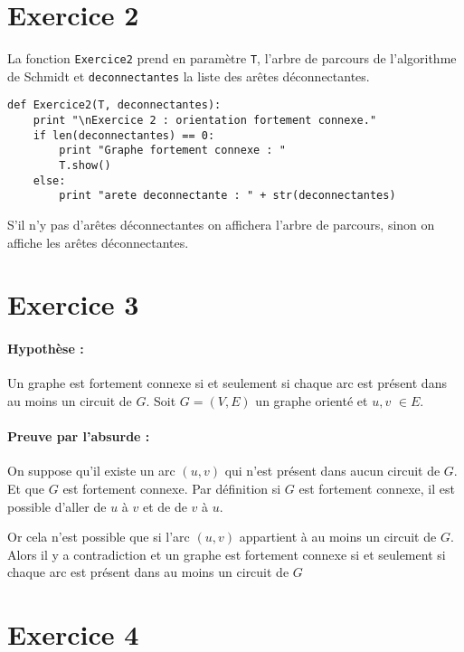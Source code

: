 \documentclass[11pt, a4paper]{article}
\begin{document}
\section*{Exercice 2}
La fonction \verb|Exercice2| prend en paramètre \verb|T|, l'arbre de parcours de l'algorithme de Schmidt et \verb|deconnectantes| la liste des arêtes déconnectantes.

\begin{verbatim}
def Exercice2(T, deconnectantes):
    print "\nExercice 2 : orientation fortement connexe."
    if len(deconnectantes) == 0:
        print "Graphe fortement connexe : "
        T.show()
    else:
        print "arete deconnectante : " + str(deconnectantes)
\end{verbatim}

S'il n'y pas d'arêtes déconnectantes on affichera l'arbre de parcours, sinon on affiche les arêtes déconnectantes.

\section*{Exercice 3}

\paragraph{Hypothèse :}Un graphe est fortement connexe si et seulement si chaque arc est présent dans au moins un circuit de $G$. Soit $G=(V,E)$ un graphe orienté et $u,v$ $\in E$.
\paragraph{Preuve par l'absurde :}On suppose qu'il existe un arc $(u,v)$ qui n'est présent dans aucun circuit de $G$. Et que $G$ est fortement connexe.
Par définition si $G$ est fortement connexe, il est possible d'aller de $u$ à $v$ et de de $v$ à $u$.

Or cela n'est possible que si l'arc $(u,v)$ appartient à au moins un circuit de $G$. Alors il y a contradiction et un graphe est fortement connexe si et seulement si chaque arc est présent dans au moins un circuit de $G$ 


\section*{Exercice 4}
\end{document}
